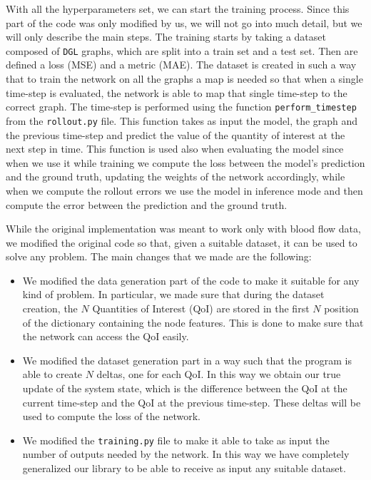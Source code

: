 \documentclass[11pt,a4paper]{article}
\begin{document}
With all the hyperparameters set, we can start the training process. Since this part of the code was only modified by us, we will not go into much detail, but we will only describe the main steps. The training starts by taking a dataset composed of \texttt{DGL} graphs, which are split into a train set and a test set. Then are defined a loss (MSE) and a metric (MAE). The dataset is created in such a way that to train the network on all the graphs a map is needed so that when a single time-step is evaluated, the network is able to map that single time-step to the correct graph. The time-step is performed using the function \texttt{perform\_timestep} from the \texttt{rollout.py} file. This function takes as input the model, the graph and the previous time-step and predict the value of the quantity of interest at the next step in time. This function is used also when evaluating the model since when we use it while training we compute the loss between the model's prediction and the ground truth, updating the weights of the network accordingly, while when we compute the rollout errors we use the model in inference mode and then compute the error between the prediction and the ground truth.

While the original implementation was meant to work only with blood flow data, we modified the original code so that, given a suitable dataset, it can be used to solve any problem. The main changes that we made are the following:
\begin{itemize}
    \item We modified the data generation part of the code to make it suitable for any kind of problem. In particular, we made sure that during the dataset creation, the \(N\) Quantities of Interest (QoI) are stored in the first \(N\) position of the dictionary containing the node features. This is done to make sure that the network can access the QoI easily. 
    \item We modified the dataset generation part in a way such that the program is able to create \(N\) deltas, one for each QoI. In this way we obtain our true update of the system state, which is the difference between the QoI at the current time-step and the QoI at the previous time-step. These deltas will be used to compute the loss of the network. 
    \item We modified the \texttt{training.py} file to make it able to take as input the number of outputs needed by the network. In this way we have completely generalized our library to be able to receive as input any suitable dataset.
    
\end{itemize}
\end{document}
